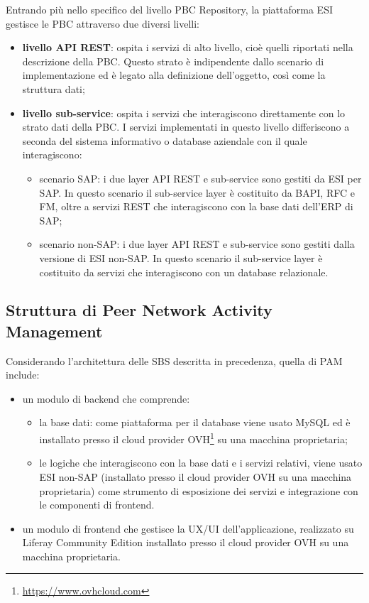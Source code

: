 Entrando più nello specifico del livello \ac{PBC} Repository, la piattaforma \ac{ESI} gestisce le \ac{PBC}
attraverso due diversi livelli:
\begin{itemize}
    \item \textbf{livello API REST}: ospita i servizi di alto livello, cioè quelli riportati nella descrizione
    della \ac{PBC}. Questo strato è indipendente dallo scenario di implementazione ed è legato alla
    definizione dell’oggetto, così come la struttura dati;
    \item \textbf{livello sub-service}: ospita i servizi che interagiscono direttamente con lo strato dati
    della \ac{PBC}. I servizi implementati in questo livello differiscono a seconda del sistema informativo
    o database aziendale con il quale interagiscono:
    \begin{itemize}
        \item scenario SAP: i due layer API REST e sub-service sono gestiti da \ac{ESI} per SAP.
        In questo scenario il sub-service layer è costituito da BAPI, RFC e FM, oltre a servizi REST
        che interagiscono con la base dati dell'\ac{ERP} di SAP;
        \item scenario non-SAP: i due layer API REST e sub-service sono gestiti dalla versione
        di \ac{ESI} non-SAP. In questo scenario il sub-service layer è costituito da servizi che
        interagiscono con un database relazionale.
    \end{itemize}
\end{itemize}

    \subsection{Struttura di Peer Network Activity Management}
    Considerando l’architettura delle \ac{SBS} descritta in precedenza, quella di \ac{PAM} include:
    \begin{itemize}
        \item un modulo di backend che comprende:
        \begin{itemize}
            \item la base dati: come piattaforma per il database viene usato MySQL ed è installato presso il
            cloud provider OVH\footnote{\url{https://www.ovhcloud.com}} su una macchina proprietaria;
            \item le logiche che interagiscono con la base dati e i servizi relativi, viene usato
            \ac{ESI} non-SAP (installato presso il cloud provider OVH su una macchina proprietaria) come
            strumento di esposizione dei servizi e integrazione con le componenti di frontend.
        \end{itemize}
        \item un modulo di frontend che gestisce la UX/UI dell’applicazione, realizzato su
        Liferay Community Edition installato presso il cloud provider OVH su una macchina proprietaria.
    \end{itemize}

